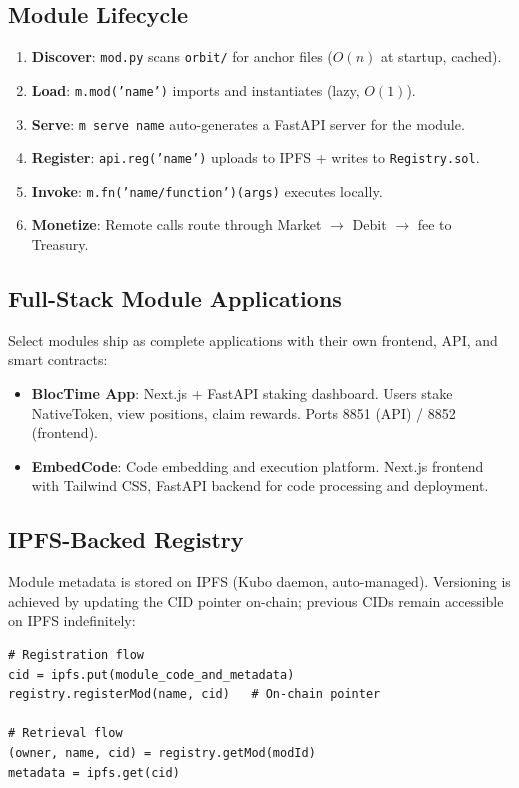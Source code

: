 \documentclass[11pt,a4paper]{article}
\begin{document}
\subsection{Module Lifecycle}

\begin{enumerate}
    \item \textbf{Discover}: \texttt{mod.py} scans \texttt{orbit/} for anchor files ($O(n)$ at startup, cached).
    \item \textbf{Load}: \texttt{m.mod('name')} imports and instantiates (lazy, $O(1)$).
    \item \textbf{Serve}: \texttt{m serve name} auto-generates a FastAPI server for the module.
    \item \textbf{Register}: \texttt{api.reg('name')} uploads to IPFS + writes to \texttt{Registry.sol}.
    \item \textbf{Invoke}: \texttt{m.fn('name/function')(args)} executes locally.
    \item \textbf{Monetize}: Remote calls route through Market $\to$ Debit $\to$ fee to Treasury.
\end{enumerate}

\subsection{Full-Stack Module Applications}

Select modules ship as complete applications with their own frontend, API, and smart contracts:

\begin{itemize}
    \item \textbf{BlocTime App}: Next.js + FastAPI staking dashboard. Users stake NativeToken, view positions, claim rewards. Ports 8851 (API) / 8852 (frontend).
    \item \textbf{EmbedCode}: Code embedding and execution platform. Next.js frontend with Tailwind CSS, FastAPI backend for code processing and deployment.
\end{itemize}

\subsection{IPFS-Backed Registry}

Module metadata is stored on IPFS (Kubo daemon, auto-managed). Versioning is achieved by updating the CID pointer on-chain; previous CIDs remain accessible on IPFS indefinitely:

\begin{lstlisting}[style=python]
# Registration flow
cid = ipfs.put(module_code_and_metadata)
registry.registerMod(name, cid)   # On-chain pointer

# Retrieval flow
(owner, name, cid) = registry.getMod(modId)
metadata = ipfs.get(cid)
\end{lstlisting}
\end{document}
